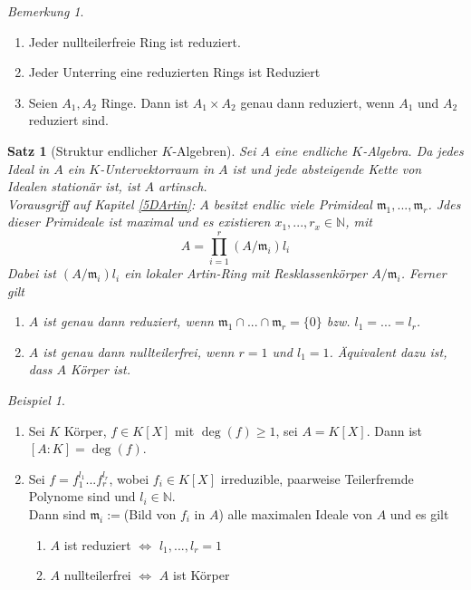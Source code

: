 \documentclass[10pt,a4paper]{article}
\newcommand{\N}{\ensuremath{\mathbb{N}}}
\newcounter{thm}[section]
\theoremstyle{definition}
\theoremstyle{plain}
\newtheorem{satz}[thm]{Satz}
\theoremstyle{remark}
\newtheorem{bem}[thm]{Bemerkung}
\newtheorem{exm}[thm]{Beispiel}
\begin{document}
\begin{bem}
	\begin{enumerate}
		\item Jeder nullteilerfreie Ring ist reduziert.
		\item Jeder Unterring eine reduzierten Rings ist Reduziert
		\item  Seien $A_1,A_2$ Ringe. Dann ist $A_1\times A_2$ genau dann reduziert, wenn $A_1$ und $A_2$ reduziert sind.
	\end{enumerate}
\end{bem}

\begin{satz}[Struktur endlicher $K$-Algebren]\label{813struktur}
	Sei $A$ eine endliche $K$-Algebra. Da jedes Ideal in $A$ ein $K$-Untervektorraum in $A$ ist und jede absteigende Kette von Idealen stationär ist, ist $A$ artinsch.\\
	Vorausgriff auf Kapitel \ref{5DArtin}: $A$ besitzt endlic viele Primideal $\mathfrak m_1,...,\mathfrak m_r$. Jdes dieser Primideale ist maximal und es existieren $x_1,...,r_x\in\N$, mit
	\[A=\prod_{i=1}^r(A/\mathfrak m_i) l_i\]
	Dabei ist $(A/\mathfrak m_i)l_i$ ein lokaler Artin-Ring mit Resklassenkörper $A/\mathfrak m_i$. Ferner gilt
	\begin{enumerate}
		\item $A$ ist genau dann reduziert, wenn $\mathfrak m_1\cap...\cap\mathfrak m_r=\{0\}$ bzw. $l_1=...=l_r$.
		\item $A$ ist genau dann nullteilerfrei, wenn $r=1$ und $l_1=1$. Äquivalent dazu ist, dass $A$ Körper ist.
	\end{enumerate}
\end{satz}

\begin{exm}
	\begin{enumerate}
		\item Sei $K$ Körper, $f\in K[X]$ mit $\deg(f)\geq 1$, sei $A=K[X]$. Dann ist $[A:K]=\deg(f)$.
		\item Sei $f=f_1^{l_1}...f_r^{l_r}$, wobei $f_i\in K[X]$ irreduzible, paarweise Teilerfremde Polynome sind und $l_i\in\N$.\\
		Dann sind $\mathfrak m_i:=$(Bild von $f_i$ in $A$) alle maximalen Ideale von $A$ und es gilt
		\begin{enumerate}
			\item $A$ ist reduziert $\Leftrightarrow$ $l_1,...,l_r=1$
			\item $A$ nullteilerfrei $\Leftrightarrow$ $A$ ist Körper
		\end{enumerate}
	\end{enumerate}
\end{exm}
\end{document}
